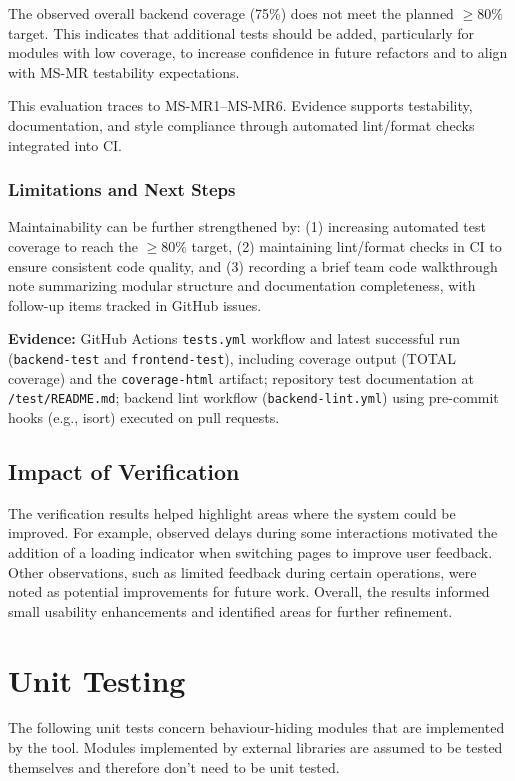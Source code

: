 \documentclass[12pt, titlepage]{article}
\begin{document}
The observed overall backend coverage (75\%) does not meet the planned
$\geq 80\%$ target.  This indicates that additional tests should be
added, particularly for modules with low coverage, to increase confidence in
future refactors and to align with MS-MR testability expectations.

This evaluation traces to MS-MR1--MS-MR6.  Evidence supports testability,
documentation, and style compliance through automated lint/format checks
integrated into CI.

\subsubsection{Limitations and Next Steps}
Maintainability can be further strengthened by:
(1) increasing automated test coverage to reach the $\geq 80\%$ target,
(2) maintaining lint/format checks in CI to ensure consistent code quality,
and
(3) recording a brief team code walkthrough note summarizing modular structure
and documentation completeness, with follow-up items tracked in GitHub issues.

\noindent \textbf{Evidence:}
GitHub Actions \texttt{tests.yml} workflow and latest successful run
(\texttt{backend-test} and \texttt{frontend-test}), including coverage output
(TOTAL coverage) and the \texttt{coverage-html} artifact; repository test
documentation at \texttt{/test/README.md}; backend lint workflow
(\texttt{backend-lint.yml}) using pre-commit hooks (e.g., isort) executed on
pull requests.

\subsection{Impact of Verification}
The verification results helped highlight areas where the system could be improved.
For example, observed delays during some interactions motivated the addition of a loading indicator when switching pages to improve user feedback. Other observations, such as limited feedback during certain operations, were noted as potential improvements for future work. Overall, the results informed small usability enhancements and identified areas for further refinement.

\section{Unit Testing}
The following unit tests concern behaviour-hiding modules that are implemented by the tool. Modules implemented by external libraries are assumed to be tested themselves and therefore don't need to be unit tested.
\end{document}

